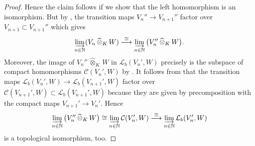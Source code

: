 \documentclass[a4paper, reqno, 10pt]{amsart}
\theoremstyle{definition}
\numberwithin{equation}{section}
\newcommand{\cotimes}[1]{{\,\widehat{\otimes}_{#1}\,}}
\newcommand{\lra}{\longrightarrow}
\newcommand{\ra}{\rightarrow}
\newcommand{\BN}{{\mathbb {N}}}
\newcommand{\CC}{{\mathcal {C}}}
\newcommand{\CL}{{\mathcal {L}}}
\begin{document}
\begin{proof}
Hence the claim follows if we show that the left homomorphism is an isomorphism.
But by \cite[Lemma 16.4 (iii)]{Schneider02NonArchFunctAna}, the transition maps $V_n'' \ra V_{n+1}''$ factor over $V_{n+1}\subset V_{n+1}''$ which gives 
\begin{equation*}
	\varinjlim_{n \in \BN} (V_n \cotimes{K} W) \overset{\cong}{\lra} \varinjlim_{n\in\BN} \big( V_n'' \cotimes{K} W \big) .
\end{equation*}
Moreover, the image of $V_n'' \cotimes{K} W$ in $\CL_b(V_n', W)$ precisely is the subspace of compact homomorphisms $\CC(V_n', W)$ by \cite[Prop.\ 18.11]{Schneider02NonArchFunctAna}.
It follows from \cite[Rmk.\ 16.7 (i)]{Schneider02NonArchFunctAna} that the transition maps $\CL_b( V_n', W) \ra \CL_b(V_{n+1}',W)$ factor over $\CC(V_{n+1}',W) \subset \CL_b(V_{n+1}', W)$ because they are given by precomposition with the compact maps $V_{n+1}' \ra V_n'$.
Hence
\begin{equation*}
	\varinjlim_{n\in\BN} \big( V_n'' \cotimes{K} W \big)  \cong \varinjlim_{n \in \BN} \CC(V_{n}',W)  \overset{\cong}{\lra} \varinjlim_{n \in \BN} \CL_b(V'_n, W) 
\end{equation*}
is a topological isomorphism, too.
\end{proof}
\end{document}
